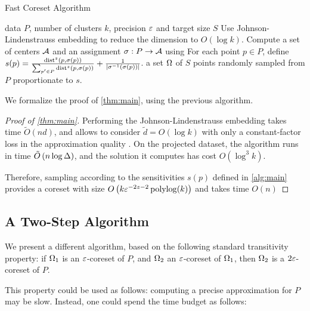 \begin{algorithm}[tb]
   \caption{Fast Coreset Algorithm}
   \label{alg:main}
\begin{algorithmic}
    data $P$, number of clusters $k$, precision $\varepsilon$ and target size $S$
   \STATE Use Johnson-Lindenstrauss embedding to reduce the dimension to $O(\log k)$.
   \STATE Compute a set of centers $\mathcal A$ and an assignment $\sigma : P \rightarrow \mathcal A$ using \fkmeans
   \STATE For each point $p \in P$, define $s(p) = \frac{\operatorname{dist}^z(p, \sigma(p))}{\sum_{p' \in P} \operatorname{dist}^z(p, \sigma(p))} + \frac{1}{|\sigma^{-1}(\sigma(p))|}$.
    a set $\Omega$ of $S$ points randomly sampled from $P$ proportionate to $s$.
\end{algorithmic}
\end{algorithm}


We formalize the proof of \cref{thm:main}, using the previous algorithm.

\begin{proof}[Proof of \cref{thm:main}]
Performing the Johnson-Lindenstrauss embedding takes time $\tilde O(nd)$, and allows to consider $\tilde d=O(\log k)$ with only a constant-factor loss in the approximation quality  \cite{makarychev2019performance}. 
On the projected dataset, the algorithm \fkmeans runs in time $\tilde O\left( n \log \Delta\right)$, and the solution it computes has cost $O(\log^3 k)$. 

Therefore, sampling according to the sensitivities $s(p)$ defined in \cref{alg:main} provides a coreset with size $O \left( k \varepsilon^{-2z -2}\operatorname{polylog}(k) \right)$  and takes time $O(n)$ 
\end{proof}



\subsection{A Two-Step Algorithm}
We present a different algorithm, based on the following standard transitivity property: if $\Omega_1$ is an $\varepsilon$-coreset of $P$, and $\Omega_2$ an $\varepsilon$-coreset of $\Omega_1$, then $\Omega_2$ is a $2\varepsilon$-coreset of $P$.

This property could be used as follows: computing a precise approximation for $P$ may be slow. Instead, one could spend the time budget as follows:


